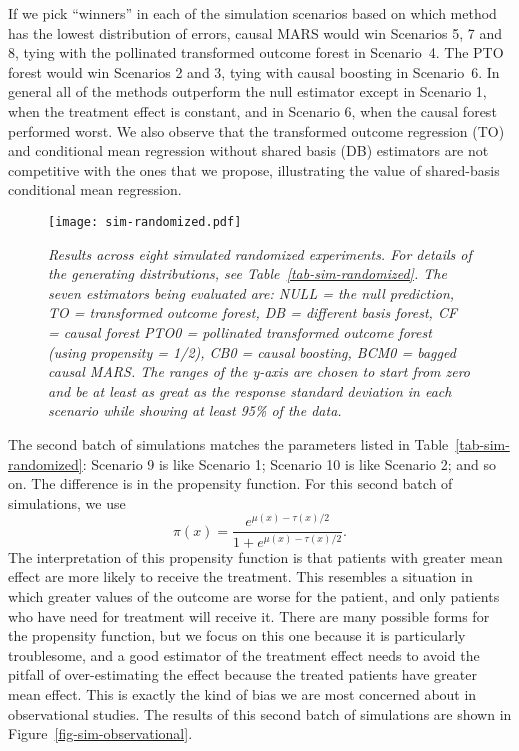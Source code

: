 \documentclass{article}
\begin{document}
If we pick ``winners'' in each of the simulation scenarios based on which method
has the lowest distribution of errors, causal MARS would win Scenarios 5, 7 and
8, tying with the pollinated transformed outcome forest in Scenario~4. The PTO
forest would win Scenarios 2 and 3, tying with causal boosting in Scenario~6.
In general all of the methods outperform the null
estimator except in Scenario 1, when the treatment effect is constant, and in
Scenario 6, when the causal forest performed worst. We also observe that the
transformed outcome regression (TO) and conditional mean regression without
shared basis (DB) estimators are not competitive with the ones that we propose,
illustrating the value of shared-basis conditional mean regression.

\begin{figure}
\caption{\it Results across eight simulated randomized experiments.
  For details of the generating distributions, see
  Table~\ref{tab-sim-randomized}. The seven estimators being evaluated are:
  NULL = the null prediction, TO = transformed outcome forest,
  DB = different basis forest, CF = causal forest
  PTO0 = pollinated transformed outcome forest (using propensity = 1/2),
  CB0 = causal boosting, BCM0 = bagged causal MARS. The ranges of the y-axis are
  chosen to start from zero and be at least as great as the response standard
  deviation in each scenario while showing at least 95\% of the data.}
\label{fig-sim-randomized}
\centering
\texttt{[image: sim-randomized.pdf]}
\end{figure}

The second batch of simulations matches the parameters listed in
Table~\ref{tab-sim-randomized}: Scenario 9 is like Scenario 1; Scenario 10 is
like Scenario 2; and so on. The difference is in the propensity function. For
this second batch of simulations, we use
\begin{equation}
\label{eqn-propensity-simulation}
\pi(x) = \frac{e^{\mu(x) - \tau(x)/2}}{1 + e^{\mu(x) - \tau(x)/2}}.
\end{equation}
The interpretation of this propensity function is that patients with greater
mean effect are more likely to receive the treatment. This resembles a
situation in which greater values of the outcome are worse for the patient, and
only patients who have need for treatment will receive it. There are many
possible forms for the propensity function, but we focus on this one because it
is particularly troublesome, and a good estimator of the treatment effect needs
to avoid the pitfall of over-estimating the effect because the treated
patients have greater mean effect. This is exactly the kind of bias we are most
concerned about in observational studies. The results of this second batch of
simulations are shown in Figure~\ref{fig-sim-observational}.
\end{document}
